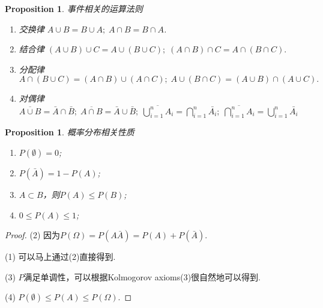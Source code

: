 \documentclass{article}
\newtheorem{proposition}[theorem]{Proposition}
\begin{document}
\begin{proposition}
\rm {\color{red}事件相关的运算法则}
\begin{enumerate}
	\item 交换律 $A \cup B = B \cup A;\;A \cap B = B \cap A$.
	\item 结合律 $(A \cup B) \cup C = A \cup (B \cup C);\; (A \cap B) \cap C = A \cap (B \cap C).$
	\item 分配律 $A \cap (B \cup C) = (A \cap B) \cup (A \cap C);\; A \cup (B \cap C) = (A \cup B) \cap (A \cup C).$
	\item 对偶律 $\overline{A \cup B} = \bar{A} \cap \bar{B};\; \overline{A \cap B} = \bar{A} \cup \bar{B};\; \overline{\bigcup\limits_{i=1}^n A_i} = \bigcap\limits_{i=1}^n \bar{A_i};\; \overline{\bigcap\limits_{i=1}^n A_i} = \bigcup\limits_{i=1}^n \bar{A_i}$ 
\end{enumerate}
\end{proposition}


\begin{proposition}
\rm {\color{red}概率分布相关性质}
\begin{enumerate}
	\item $P(\emptyset) = 0$;
	\item $P(\bar{A}) = 1 - P(A)$;
	\item $A\subset B$，则$P(A) \leq P(B)$;
	\item $0 \leq P(A) \leq 1$;
\end{enumerate}
\end{proposition}

\begin{proof}
(2) 因为$P(\Omega) = P(A\bar{A}) =P(A) + P(\bar{A})$.

(1) 可以马上通过(2)直接得到.

(3) $P$满足{\color{blue}单调性}，可以根据Kolmogorov axioms(3)很自然地可以得到.

(4) $P(\emptyset) \leq P(A) \leq P(\Omega).$
\end{proof}
\end{document}
